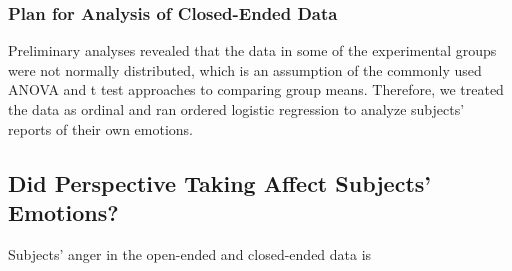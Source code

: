 \documentclass[man,a4paper,noextraspace,apacite]{apa6}\usepackage[]{graphicx}\usepackage[]{color}
\begin{document}
\subsubsection{Plan for Analysis of Closed-Ended Data} Preliminary analyses revealed that the data in some of the experimental groups were not normally distributed, which is an assumption of the commonly used ANOVA and t test approaches to comparing group means. Therefore, we treated the data as ordinal and ran ordered logistic regression to analyze subjects' reports of their own emotions.


\subsection{Did Perspective Taking Affect Subjects' Emotions?}

Subjects' anger in the open-ended and closed-ended data is 




\end{document}
